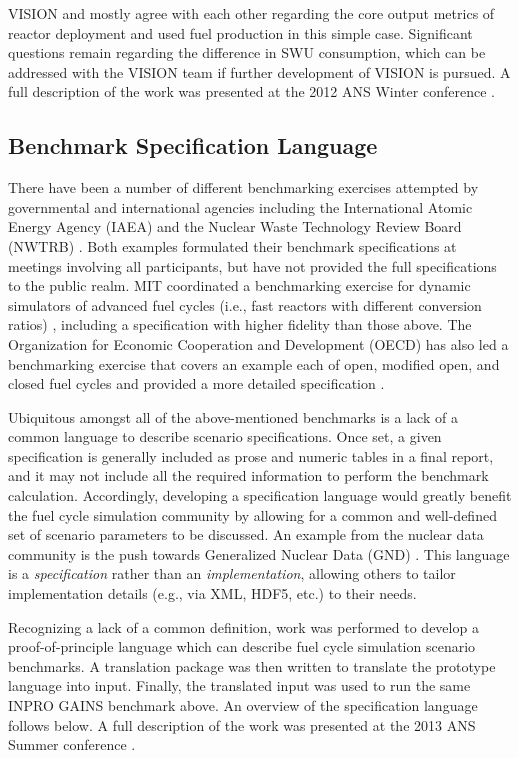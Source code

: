 VISION and \Cyclus mostly agree with each other regarding the core output
metrics of reactor deployment and used fuel production in this simple
case. Significant questions remain regarding the difference in SWU consumption,
which can be addressed with the VISION team if further development of VISION is
pursued. A full description of the work was presented at the 2012
ANS Winter conference \cite{gidden_once-through_2012}.

\subsection{Benchmark Specification Language}

There have been a number of different benchmarking exercises attempted by
governmental and international agencies including the International Atomic
Energy Agency (IAEA) \cite{_international_2011} and the Nuclear Waste Technology
Review Board (NWTRB) \cite{_nuclear_2011}.  Both examples formulated their
benchmark specifications at meetings involving all participants, but have not
provided the full specifications to the public realm. MIT coordinated a
benchmarking exercise for dynamic simulators of advanced fuel cycles (i.e., fast
reactors with different conversion ratios) \cite{guerin_benchmark_2009},
including a specification with higher fidelity than those above. The
Organization for Economic Cooperation and Development (OECD) has also led a
benchmarking exercise that covers an example each of open, modified open, and
closed fuel cycles \cite{boucher_benchmark_2012} and provided a more detailed
specification \cite{boucher_specification_2008}.

Ubiquitous amongst all of the above-mentioned benchmarks is a lack of a common
language to describe scenario specifications. Once set, a given specification is
generally included as prose and numeric tables in a final report, and it may not
include all the required information to perform the benchmark
calculation. Accordingly, developing a specification language would greatly
benefit the fuel cycle simulation community by allowing for a common and
well-defined set of scenario parameters to be discussed. An example from the
nuclear data community is the push towards Generalized Nuclear Data (GND)
\cite{mattoon_generalized_2012}. This language is a \emph{specification} rather
than an \emph{implementation}, allowing others to tailor implementation details
(e.g., via XML, HDF5, etc.) to their needs.

Recognizing a lack of a common definition, work was performed to develop a
proof-of-principle language which can describe fuel cycle simulation scenario
benchmarks. A translation package was then written to translate the prototype
language into \Cyclus input. Finally, the translated \Cyclus input was used to
run the same INPRO GAINS benchmark above. An overview of the specification
language follows below. A full description of the work was presented at the 2013
ANS Summer conference \cite{gidden_developing_2013}.

